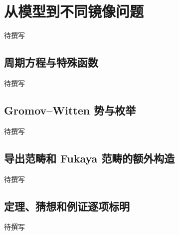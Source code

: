 
% 
% 
% 

\section{从模型到不同镜像问题}
\label{g4:sec:3303}

待撰写

\subsection{周期方程与特殊函数}
\label{g4:subsec:3303:01}
待撰写

\subsection{Gromov–Witten 势与枚举}
\label{g4:subsec:3303:02}
待撰写

\subsection{导出范畴和 Fukaya 范畴的额外构造}
\label{g4:subsec:3303:03}
待撰写

\subsection{定理、猜想和例证逐项标明}
\label{g4:subsec:3303:04}
待撰写

